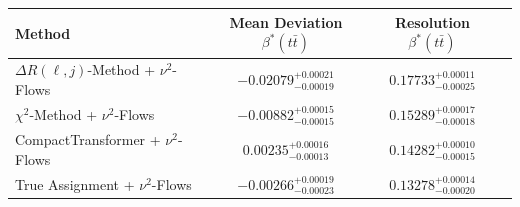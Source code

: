     \begin{tabular}{lccc}
        \toprule
        Method & Mean Deviation $\beta^*(t\bar{t})$ & Resolution $\beta^*(t\bar{t})$ \\
        \midrule
        $\Delta R(\ell,j)$-Method + $\nu^2$-Flows & $-0.02079^{+0.00021}_{-0.00019}$ & $0.17733^{+0.00011}_{-0.00025}$ \\
        $\chi^2$-Method + $\nu^2$-Flows & $-0.00882^{+0.00015}_{-0.00015}$ & $0.15289^{+0.00017}_{-0.00018}$ \\
        CompactTransformer + $\nu^2$-Flows & $0.00235^{+0.00016}_{-0.00013}$ & $0.14282^{+0.00010}_{-0.00015}$ \\
        True Assignment + $\nu^2$-Flows & $-0.00266^{+0.00019}_{-0.00023}$ & $0.13278^{+0.00014}_{-0.00020}$ \\
        \bottomrule
    \end{tabular}